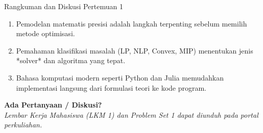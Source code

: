 \documentclass[10pt,aspectratio=169]{beamer}
\begin{document}
\begin{frame}{Rangkuman dan Diskusi Pertemuan 1}
    \begin{tcolorbox}[colback=unibblue!10,colframe=unibblue,title=\textbf{Poin Utama Minggu ke-1}]
        \begin{enumerate}
            \item Pemodelan matematis presisi adalah langkah terpenting sebelum memilih metode optimisasi.
            \item Pemahaman klasifikasi masalah (LP, NLP, Convex, MIP) menentukan jenis *solver* dan algoritma yang tepat.
            \item Bahasa komputasi modern seperti Python dan Julia memudahkan implementasi langsung dari formulasi teori ke kode program.
        \end{enumerate}
    \end{tcolorbox}

    \vspace{0.4cm}
    \begin{center}
        \Large \textbf{Ada Pertanyaan / Diskusi?} \\
        \vspace{0.2cm}
        \small \textit{Lembar Kerja Mahasiswa (LKM 1) dan Problem Set 1 dapat diunduh pada portal perkuliahan.}
    \end{center}
\end{frame}
\end{document}

